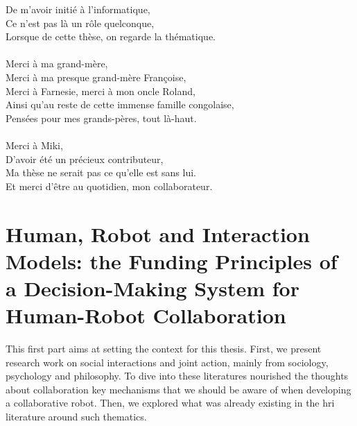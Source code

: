 \documentclass[english,a4paper,11pt,twoside]{StyleThese}
\begin{document}
De m'avoir initié à l'informatique,\\
Ce n'est pas là un rôle quelconque,\\
Lorsque de cette thèse, on regarde la thématique.\\
\\
Merci à ma grand-mère,\\
Merci à ma presque grand-mère Françoise,\\
Merci à Farnesie, merci à mon oncle Roland,\\
Ainsi qu'au reste de cette immense famille congolaise,\\
Pensées pour mes grands-pères, tout là-haut.\\
\\
Merci à Miki,\\
D'avoir été un précieux contributeur,\\
Ma thèse ne serait pas ce qu'elle est sans lui.\\
Et merci d'être au quotidien, mon collaborateur.






\tableofcontents

\printnoidxglossary[type=\acronymtype]
%



\mainmatter
{}

\fancyhead[RE]{\bfseries\nouppercase{\leftmark}}      %
\fancyhead[LO]{\bfseries\nouppercase{\rightmark}}     %

\part{Human, Robot and Interaction Models: the Funding Principles of a Decision-Making System for Human-Robot Collaboration}\label{part:part1}
\begin{partintro}
	This first part aims at setting the context for this thesis. First, we present research work on social interactions and joint action, mainly from sociology, psychology and philosophy. To dive into these literatures nourished the thoughts about collaboration key mechanisms that we should be aware of when developing a collaborative robot. Then, we explored what was already existing in the \acrlong{hri} literature around such thematics.
\end{partintro}


\end{document}
